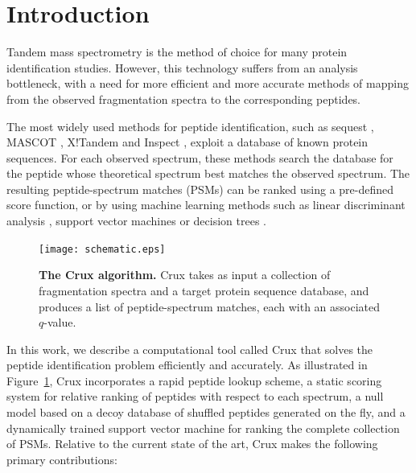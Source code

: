 \documentclass{bioinfo}
\renewcommand{\cite}{\citep}
\begin{document}
\section{Introduction}

Tandem mass spectrometry is the method of choice for many protein
identification studies.  However, this technology suffers from an
analysis bottleneck, with a need for more efficient and more accurate
methods of mapping from the observed fragmentation spectra to the
corresponding peptides.

The most widely used methods for peptide identification, such as
{\sc sequest} \cite{eng:approach}, MASCOT \cite{perkins:probability},
X!Tandem \cite{craig:tandem} and Inspect \cite{tanner:inspect},
exploit a database of known protein sequences.  For each observed
spectrum, these methods search the database for the peptide whose
theoretical spectrum best matches the observed spectrum.  The
resulting peptide-spectrum matches (PSMs) can be ranked using a
pre-defined score function, or by using machine learning methods such
as linear discriminant analysis \cite{keller:empirical}, support
vector machines \cite{anderson:new, kall:semi-supervised} or decision
trees \cite{elias:intensity}.

\begin{figure}
\centering
\texttt{[image: schematic.eps]}
\caption{{\bf The Crux algorithm.}  Crux takes as input a collection
  of fragmentation spectra and a target protein sequence database, and
  produces a list of peptide-spectrum matches, each with an associated
  $q$-value.
  \label{figure:crux}}
\end{figure}

In this work, we describe a computational tool called Crux that solves
the peptide identification problem efficiently and accurately.  As
illustrated in Figure~\ref{figure:crux}, Crux incorporates a rapid
peptide lookup scheme, a static scoring system for relative ranking of
peptides with respect to each spectrum, a null model based on a decoy
database of shuffled peptides generated on the fly, and a dynamically
trained support vector machine for ranking the complete collection of
PSMs.  Relative to the current state of the art, Crux makes the
following primary contributions:
\end{document}
